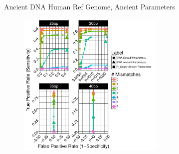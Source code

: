 \documentclass{beamer}
\begin{document}
\begin{frame}{\small{Ancient DNA Human Ref Genome, Ancient Parameters}}
	\begin{figure}[H]
		\centering
		\includegraphics[width=7cm]{pics/f_DS4_emp.pdf}
		
	\end{figure}

\end{frame}


\end{document}
